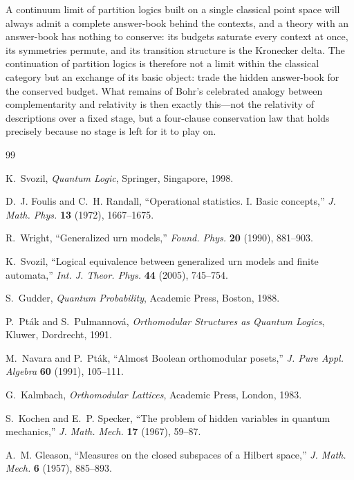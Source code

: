 \documentclass[11pt]{article}
\theoremstyle{definition}
\theoremstyle{remark}
\begin{document}
A continuum limit of partition logics built on a single classical point
space will always admit a complete answer-book behind the contexts, and
a theory with an answer-book has nothing to conserve: its budgets
saturate every context at once, its symmetries permute, and its
transition structure is the Kronecker delta. The continuation of
partition logics is therefore not a limit within the classical category
but an exchange of its basic object: trade the hidden answer-book for
the conserved budget. What remains of Bohr's celebrated analogy between
complementarity and relativity is then exactly this---not the relativity
of descriptions over a fixed stage, but a four-clause conservation law
that holds precisely because no stage is left for it to play on.

\begin{thebibliography}{99}

K.~Svozil, \emph{Quantum Logic}, Springer, Singapore, 1998.

D.~J. Foulis and C.~H. Randall, ``Operational statistics. I. Basic
concepts,'' \emph{J. Math. Phys.} \textbf{13} (1972), 1667--1675.

R.~Wright, ``Generalized urn models,'' \emph{Found. Phys.} \textbf{20}
(1990), 881--903.

K.~Svozil, ``Logical equivalence between generalized urn models and
finite automata,'' \emph{Int. J. Theor. Phys.} \textbf{44} (2005),
745--754.

S.~Gudder, \emph{Quantum Probability}, Academic Press, Boston, 1988.

P.~Pt\'ak and S.~Pulmannov\'a, \emph{Orthomodular Structures as Quantum
Logics}, Kluwer, Dordrecht, 1991.

M.~Navara and P.~Pt\'ak, ``Almost Boolean orthomodular posets,''
\emph{J. Pure Appl. Algebra} \textbf{60} (1991), 105--111.

G.~Kalmbach, \emph{Orthomodular Lattices}, Academic Press, London, 1983.

S.~Kochen and E.~P. Specker, ``The problem of hidden variables in quantum
mechanics,'' \emph{J. Math. Mech.} \textbf{17} (1967), 59--87.

A.~M. Gleason, ``Measures on the closed subspaces of a Hilbert space,''
\emph{J. Math. Mech.} \textbf{6} (1957), 885--893.


\end{thebibliography}
\end{document}
